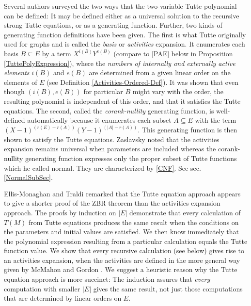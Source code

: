 \documentclass[12pt,leqno]{amsart}
\theoremstyle{remark}
\begin{document}
Several authors \cite{Ellis-Monaghan-Merino-1,Ellis-Monaghan-Traldi}
surveyed the two ways that the 
two-variable Tutte polynomial can be defined:  It 
may be defined either as a universal solution to the
recursive strong Tutte equations, or as a generating function.
Further, two kinds of generating function definitions have been given.
The first is what Tutte originally used for graphs 
\cite{TutteDich,TutteGraphBook} and is
called the \emph{basis} or \emph{activities}
expansion. It enumerates each basis $B\subseteq E$ 
by a term $X^{i(B)}Y^{e(B)}$ (compare to \eqref{PAE} below
in Proposition \ref{TuttePolyExpression}), where the 
\emph{numbers of internally and externally active elements} 
$i(B)$ and $e(B)$ are determined from a given linear order
on the elements of $E$ (see Definition \ref{Activities-Ordered-Def}).
It was shown that even though $(i(B),e(B))$ for particular $B$
might vary with the order, the resulting polynomial is
independent of this order, and that it satisfies the Tutte equations.
The second, called the \emph{corank-nullity} generating function, 
is well-defined automatically
because it enumerates each subset $A\subseteq E$ with
the term $(X-1)^{(r(E)-r(A))}(Y-1)^{(|A|-r(A))}$.  
This generating function is then shown to satisfy the Tutte equations.
Zaslavsky noted that the activities expansion remains universal when parameters
are included whereas the corank-nullity generating function expresses only the
proper subset of Tutte functions which he called normal\cite{MR93a:05047}.
They are characterized by \eqref{CNF}.
See sec. \ref{NormalSubSec}.


Ellis-Monaghan and 
Traldi \cite{Ellis-Monaghan-Traldi} remarked that the Tutte equation
approach appears to give a shorter proof of the ZBR theorem
than the activities expansion approach. 
The proofs by induction on $|E|$
demonstrate that every calculation of $T(M)$ from Tutte equations
produces the same result when the conditions on the parameters
and initial values are satisfied.  We then know immediately that
the polynomial expression
resulting from
a particular calculation equals the Tutte function value.
We show that every recursive calculation (see below)
gives rise to an 
activities expansion, when the activities are defined in the
more general way given by McMahon and Gordon \cite{GordonMcMachonGreedoid}.
We suggest a heuristic reason why
the Tutte equation approach is more succinct:
The induction assures that
\emph{every} computation
with smaller $|E|$ gives the same result, not just those 
computations that are determined by linear orders on $E$.
\end{document}
